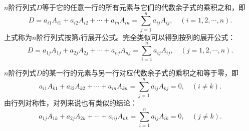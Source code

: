 

\begin{thm} \label{thm:det_minor1}
$n$阶行列式$D$等于它的任意一行的所有元素与它们的代数余子式的乘积之和，即
$$D = a_{i1}A_{i1} + a_{i2}A_{i2} + \cdots + a_{in}A_{in} = \sum\limits_{j=1}^n a_{ij}A_{ij}, \quad (i=1,2,\cdots,n).$$
上式称为$n$阶行列式按第$i$行展开公式。完全类似可以得到按列的展开公式：
$$D = a_{1j}A_{1j} + a_{2j}	A_{2j} + \cdots + a_{nj}A_{nj} = \sum\limits_{i=1}^n a_{ij}A_{ij}, \quad (j=1,2,\cdots,n).$$
\end{thm}

\begin{thm} \label{thm:det_minor2}
$n$阶行列式$D$的某一行的元素与另一行对应代数余子式的乘积之和等于零，即
$$a_{i1}A_{k1} + a_{i2}A_{k2} + \cdots + a_{in}A_{kn} = \sum\limits_{j=1}^n a_{ij}A_{kj} = 0, \quad (i\neq k).$$
由行列对称性，对列来说也有类似的结论：
$$a_{1j}A_{1k} + a_{2j}A_{2k} + \cdots + a_{nj}A_{nk} = \sum\limits_{i=1}^n a_{ij}A_{ik} = 0, \quad (j\neq k).$$
\end{thm}

